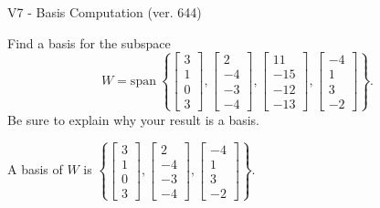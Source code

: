 \begin{exercise}
  \begin{exerciseTitle}V7 - Basis Computation (ver. 644)\end{exerciseTitle}
  \begin{exerciseStatement}
    Find a basis for the subspace 
\[W=\mathrm{span}\ \left\{\left[\begin{array}{r}
3 \\
1 \\
0 \\
3
\end{array}\right] , \left[\begin{array}{r}
2 \\
-4 \\
-3 \\
-4
\end{array}\right] , \left[\begin{array}{r}
11 \\
-15 \\
-12 \\
-13
\end{array}\right] , \left[\begin{array}{r}
-4 \\
1 \\
3 \\
-2
\end{array}\right]\right\}.\]
 Be sure to explain why your result is a basis.


  \end{exerciseStatement}
  \begin{exerciseAnswer}
   A basis of \(W\) is  \(\left\{\left[\begin{array}{r}
3 \\
1 \\
0 \\
3
\end{array}\right] , \left[\begin{array}{r}
2 \\
-4 \\
-3 \\
-4
\end{array}\right] , \left[\begin{array}{r}
-4 \\
1 \\
3 \\
-2
\end{array}\right]\right\}\).
  


  \end{exerciseAnswer}
\end{exercise}